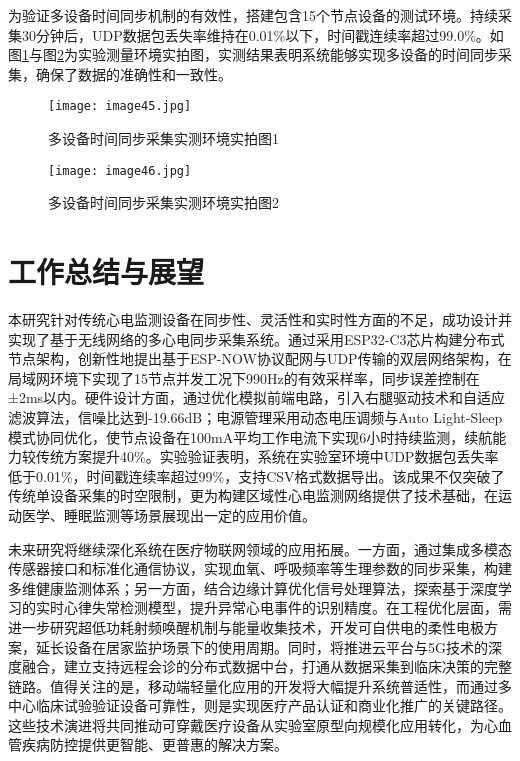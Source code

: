 为验证多设备时间同步机制的有效性，搭建包含15个节点设备的测试环境。持续采集30分钟后，UDP数据包丢失率维持在0.01\%以下，时间戳连续率超过99.0\%。如图\ref{F.ECG_image45}与图\ref{F.ECG_image46}为实验测量环境实拍图，实测结果表明系统能够实现多设备的时间同步采集，确保了数据的准确性和一致性。

\begin{figure}[htb]
    \centering
    \texttt{[image: image45.jpg]}
    \caption{多设备时间同步采集实测环境实拍图1}
    \label{F.ECG_image45}
\end{figure}

\begin{figure}[htb]
    \centering
    \texttt{[image: image46.jpg]}
    \caption{多设备时间同步采集实测环境实拍图2}
    \label{F.ECG_image46}
\end{figure}



\section{工作总结与展望}

本研究针对传统心电监测设备在同步性、灵活性和实时性方面的不足，成功设计并实现了基于无线网络的多心电同步采集系统。通过采用ESP32-C3芯片构建分布式节点架构，创新性地提出基于ESP-NOW协议配网与UDP传输的双层网络架构，在局域网环境下实现了15节点并发工况下990Hz的有效采样率，同步误差控制在±2ms以内。硬件设计方面，通过优化模拟前端电路，引入右腿驱动技术和自适应滤波算法，信噪比达到-19.66dB；电源管理采用动态电压调频与Auto Light-Sleep模式协同优化，使节点设备在100mA平均工作电流下实现6小时持续监测，续航能力较传统方案提升40\%。实验验证表明，系统在实验室环境中UDP数据包丢失率低于0.01\%，时间戳连续率超过99\%，支持CSV格式数据导出。该成果不仅突破了传统单设备采集的时空限制，更为构建区域性心电监测网络提供了技术基础，在运动医学、睡眠监测等场景展现出一定的应用价值。

未来研究将继续深化系统在医疗物联网领域的应用拓展。一方面，通过集成多模态传感器接口和标准化通信协议，实现血氧、呼吸频率等生理参数的同步采集，构建多维健康监测体系；另一方面，结合边缘计算优化信号处理算法，探索基于深度学习的实时心律失常检测模型，提升异常心电事件的识别精度。在工程优化层面，需进一步研究超低功耗射频唤醒机制与能量收集技术，开发可自供电的柔性电极方案，延长设备在居家监护场景下的使用周期。同时，将推进云平台与5G技术的深度融合，建立支持远程会诊的分布式数据中台，打通从数据采集到临床决策的完整链路。值得关注的是，移动端轻量化应用的开发将大幅提升系统普适性，而通过多中心临床试验验证设备可靠性，则是实现医疗产品认证和商业化推广的关键路径。这些技术演进将共同推动可穿戴医疗设备从实验室原型向规模化应用转化，为心血管疾病防控提供更智能、更普惠的解决方案。

\newpage
